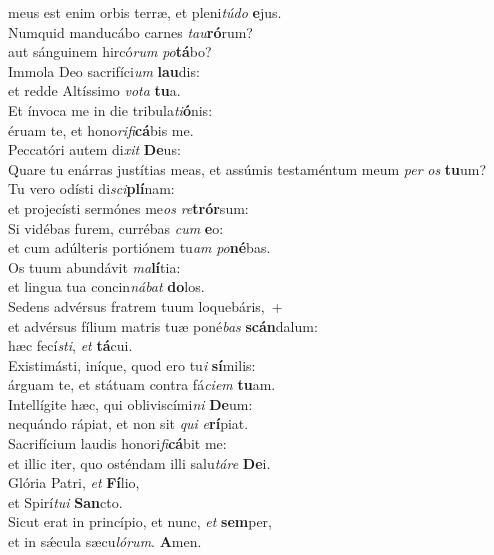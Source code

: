 \oddverse meus est enim orbis terræ, et pleni\textit{tú}\textit{do} \textbf{e}jus.\\
\evenverse Numquid manducábo carnes \textit{tau}\textbf{ró}rum?~\*\\
\evenverse aut sánguinem hircó\textit{rum} \textit{po}\textbf{tá}bo?\\
\oddverse Immola Deo sacrifíci\textit{um} \textbf{lau}dis:~\*\\
\oddverse et redde Altíssimo \textit{vo}\textit{ta} \textbf{tu}a.\\
\evenverse Et ínvoca me in die tribula\textit{ti}\textbf{ó}nis:~\*\\
\evenverse éruam te, et hono\textit{ri}\textit{fi}\textbf{cá}bis me.\\
\oddverse Peccatóri autem di\textit{xit} \textbf{De}us:~\*\\
\oddverse Quare tu enárras justítias meas, et assúmis testaméntum meum \textit{per} \textit{os} \textbf{tu}um?\\
\evenverse Tu vero odísti di\textit{sci}\textbf{plí}nam:~\*\\
\evenverse et projecísti sermónes me\textit{os} \textit{re}\textbf{trór}sum:\\
\oddverse Si vidébas furem, currébas \textit{cum} \textbf{e}o:~\*\\
\oddverse et cum adúlteris portiónem tu\textit{am} \textit{po}\textbf{né}bas.\\
\evenverse Os tuum abundávit \textit{ma}\textbf{lí}tia:~\*\\
\evenverse et lingua tua concin\textit{ná}\textit{bat} \textbf{do}los.\\
\oddverse Sedens advérsus fratrem tuum loquebáris,~+\\
\oddverse  et advérsus fílium matris tuæ poné\textit{bas} \textbf{scán}dalum:~\*\\
\oddverse hæc fecí\textit{sti}, \textit{et} \textbf{tá}cui.\\
\evenverse Existimásti, iníque, quod ero tu\textit{i} \textbf{sí}milis:~\*\\
\evenverse árguam te, et státuam contra fá\textit{ci}\textit{em} \textbf{tu}am.\\
\oddverse Intellígite hæc, qui obliviscími\textit{ni} \textbf{De}um:~\*\\
\oddverse nequándo rápiat, et non sit \textit{qui} \textit{e}\textbf{rí}piat.\\
\evenverse Sacrifícium laudis honori\textit{fi}\textbf{cá}bit me:~\*\\
\evenverse et illic iter, quo osténdam illi salu\textit{tá}\textit{re} \textbf{De}i.\\
\oddverse Glória Patri, \textit{et} \textbf{Fí}lio,~\*\\
\oddverse et Spirí\textit{tu}\textit{i} \textbf{San}cto.\\
\evenverse Sicut erat in princípio, et nunc, \textit{et} \textbf{sem}per,~\*\\
\evenverse et in sǽcula sæcu\textit{ló}\textit{rum}. \textbf{A}men.\\
